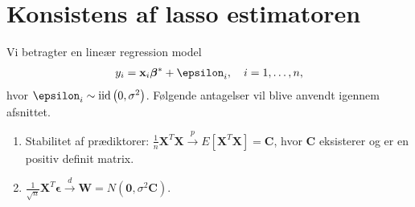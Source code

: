 \section{Konsistens af lasso estimatoren}
Vi betragter en lineær regression model 
\begin{align*}
y_i= \mathbf{x}_i \tbeta^* + \epsilon_i, \quad i = 1, \ldots, n,
\end{align*}
hvor \(\epsilon_i \sim \text{iid} \del{0, \sigma^2}\).
Følgende antagelser vil blive anvendt igennem afsnittet.
\begin{ass} \label{ass:konsistens}
\begin{enumerate}[label=\alph*)]
\item Stabilitet af prædiktorer:
$\frac{1}{n} \textbf{X}^T \textbf{X} \overset{p}{\rightarrow} E[\textbf{X}^T \textbf{X}] = \textbf{C}$, hvor $\textbf{C}$ eksisterer og er en positiv definit matrix.
\item $\frac{1}{\sqrt{n}} \mathbf{X}^T \boldsymbol{\epsilon} \overset{d}{\rightarrow} \mathbf{W}=N(\mathbf{0},\sigma^2 \mathbf{C})$.
\end{enumerate}
\end{ass}

